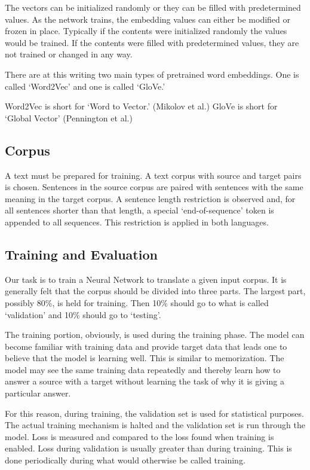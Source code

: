 The vectors can be initialized randomly or they can be filled with predetermined values. As the network trains, the embedding values can either be modified or frozen in place. Typically if the contents were initialized randomly the values would be trained. If the contents were filled with predetermined values, they are not trained or changed in any way. 

There are at this writing two main types of pretrained word embeddings. One is called \textquoteleft Word2Vec\textquoteright{} and one is called \textquoteleft GloVe.\textquoteright  

Word2Vec is short for \textquoteleft Word to Vector.\textquoteright{} (Mikolov et al.) \cite{mikolov2013efficient} GloVe is short for \textquoteleft Global Vector\textquoteright{} (Pennington et al.) \cite{pennington-etal-2014-glove} 


\subsection{Corpus}

A text must be prepared for training. A text corpus with source and target pairs is chosen. Sentences in the source corpus are paired with sentences with the same meaning in the target corpus. A sentence length restriction is observed and, for all sentences shorter than that length, a special `end-of-sequence' token is appended to all sequences. This restriction is applied in both languages.

\subsection{Training and Evaluation}
Our task is to train a Neural Network to translate a given input corpus. It is generally felt that the corpus should be divided into three parts. The largest part, possibly 80\%, is held for training. Then 10\% should go to what is called `validation' and 10\% should go to `testing'.

The training portion, obviously, is used during the training phase. The model can become familiar with training data and provide target data that leads one to believe that the model is learning well. This is similar to memorization. The model may see the same training data repeatedly and thereby learn how to answer a source with a target without learning the task of why it is giving a particular answer.

For this reason, during training, the validation set is used for statistical purposes. The actual training mechanism is halted and the validation set is run through the model. Loss is measured and compared to the loss found when training is enabled. Loss during validation is usually greater than during training. This is done periodically during what would otherwise be called training.

